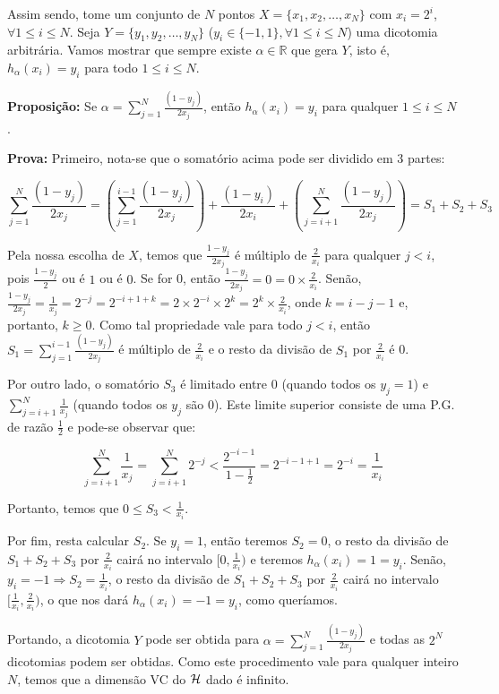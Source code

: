    Assim sendo, tome um conjunto de $N$ pontos $X = \{x_1, x_2, \ldots, x_N\}$ com $x_i = 2^i$, $\forall 1 \leq i \leq N$. Seja
    $Y = \{y_1, y_2, \ldots, y_N\}$ ($y_i \in \{-1, 1\}, \forall 1 \leq i \leq N$) uma dicotomia arbitrária. Vamos mostrar que sempre existe $\alpha \in \mathbb{R}$
    que gera $Y$, isto é, $h_{\alpha}(x_i) = y_i$ para todo $1 \leq i \leq N$.
    
    \textbf{Proposição: } Se $\alpha = \sum\limits_{j = 1}^N \frac{(1-y_j)}{2x_j}$, então $h_{\alpha}(x_i) = y_i$ para qualquer $1 \leq i \leq N$.
    
    \textbf{Prova: } Primeiro, nota-se que o somatório acima pode ser dividido em 3 partes: 
    
    \[
     \sum\limits_{j = 1}^N \frac{(1-y_j)}{2x_j}  = (\sum\limits_{j = 1}^{i - 1} \frac{(1-y_j)}{2x_j}) + \frac{(1-y_i)}{2x_i} + (\sum\limits_{j = i + 1}^{N} \frac{(1-y_j)}{2x_j}) = S_1 + S_2 + S_3
    \]

    Pela nossa escolha de $X$, temos que $\frac{1-y_j}{2x_j}$ é múltiplo de $\frac{2}{x_i}$ para qualquer $j < i$, pois $\frac{1-y_j}{2}$ ou é $1$ ou é $0$. Se for 0,
    então $\frac{1-y_j}{2x_j} = 0 = 0 \times \frac{2}{x_i}$. Senão,
    $\frac{1-y_j}{2x_j} = \frac{1}{x_j} = 2^{-j} = 2^{-i + 1 + k} = 2 \times 2^{-i} \times 2^k = 2^k \times \frac{2}{x_i}$, onde $k = i - j - 1$ e, portanto, $k \geq 0$.
    Como tal propriedade vale para todo $j < i$, então $S_1 = \sum\limits_{j = 1}^{i - 1} \frac{(1-y_j)}{2x_j}$ é múltiplo de $\frac{2}{x_i}$ e o resto da divisão de $S_1$
    por $\frac{2}{x_i}$ é 0.
    
    Por outro lado, o somatório $S_3$ é limitado entre $0$ (quando todos os $y_j  = 1$) e $\sum\limits_{j = i + 1}^{N} \frac{1}{x_j}$ (quando todos os $y_j$ são 0). Este limite
    superior consiste de uma P.G. de razão $\frac{1}{2}$ e pode-se observar que:
    
    \[
      \sum\limits_{j = i + 1}^{N} \frac{1}{x_j} = \sum\limits_{j = i + 1}^{N} 2^{-j} < \frac{2^{-i-1}}{1 - \frac{1}{2}} = 2^{-i-1+1} = 2^{-i} = \frac{1}{x_i}
    \]

    Portanto, temos que $0 \leq S_3 < \frac{1}{x_i}$.
    
    Por fim, resta calcular $S_2$. Se $y_i = 1$, então teremos $S_2 = 0$, o resto da divisão de $S_1 + S_2 + S_3$ por $\frac{2}{x_i}$ cairá no intervalo $[0, \frac{1}{x_i})$ e
    teremos $h_\alpha(x_i) = 1 = y_i$. Senão, $y_i = -1 \Rightarrow S_2 = \frac{1}{x_i}$, o resto da divisão de
    $S_1 + S_2 + S_3$ por $\frac{2}{x_i}$ cairá no intervalo $[\frac{1}{x_i}, \frac{2}{x_i})$, o que nos dará $h_\alpha(x_i) = -1 = y_i$, como queríamos.
    
    Portando, a dicotomia $Y$ pode ser obtida para $\alpha = \sum\limits_{j = 1}^N \frac{(1-y_j)}{2x_j}$ e todas as $2^N$ dicotomias podem ser obtidas. Como este procedimento
    vale para qualquer inteiro $N$, temos que a dimensão VC do $\mathcal{H}$ dado é infinito.
